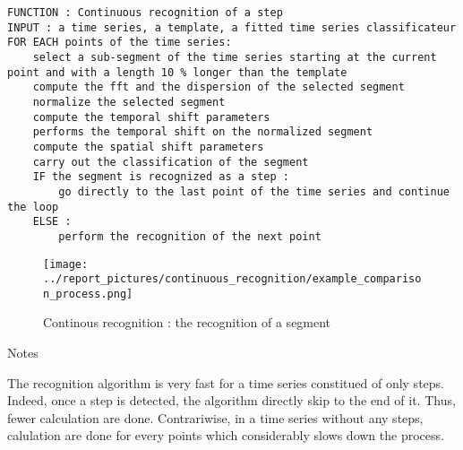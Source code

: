 \documentclass[11pt, sans]{beamer}
\begin{document}
\begin{frame}[fragile]

\begin{overprint}

\begin{lstlisting}
FUNCTION : Continuous recognition of a step
INPUT : a time series, a template, a fitted time series classificateur
FOR EACH points of the time series:
	select a sub-segment of the time series starting at the current point and with a length 10 % longer than the template
	compute the fft and the dispersion of the selected segment
	normalize the selected segment
	compute the temporal shift parameters
	performs the temporal shift on the normalized segment
	compute the spatial shift parameters
	carry out the classification of the segment 
	IF the segment is recognized as a step :
		go directly to the last point of the time series and continue the loop
	ELSE :
		perform the recognition of the next point
\end{lstlisting}


\begin{figure}[H]
	\texttt{[image: ../report\_pictures/continuous\_recognition/example\_comparison\_process.png]}
	\caption{Continous recognition : the recognition of a segment}
	\label{example_comparison_process}
\end{figure}


\begin{exampleblock}{Notes}

The recognition algorithm is very fast for a time series constitued of only steps. Indeed, once a step is detected, the algorithm directly skip to the end of it. Thus, fewer calculation are done. Contrariwise, in a time series without any steps, calulation are done for every points which considerably slows down the process.

\end{exampleblock}

\end{overprint}

\end{frame}
\end{document}
